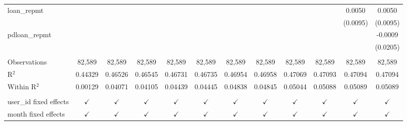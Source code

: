 \begin{table}[htbp]
\begin{tiny}
\begin{tabular}{lccccccccccc}
         loan\_repmt            &                 &                 &                 &                 &                 &                 &                 &                 &                 & 0.0050          & 0.0050\\
                                 &                 &                 &                 &                 &                 &                 &                 &                 &                 & (0.0095)        & (0.0095)\\
         pdloan\_repmt          &                 &                 &                 &                 &                 &                 &                 &                 &                 &                 & -0.0009\\
                                 &                 &                 &                 &                 &                 &                 &                 &                 &                 &                 & (0.0205)\\
                                 &                 &                 &                 &                 &                 &                 &                 &                 &                 &                 &  \\
         Observations            & 82,589          & 82,589          & 82,589          & 82,589          & 82,589          & 82,589          & 82,589          & 82,589          & 82,589          & 82,589          & 82,589\\
         R$^2$                   & 0.44329         & 0.46526         & 0.46545         & 0.46731         & 0.46735         & 0.46954         & 0.46958         & 0.47069         & 0.47093         & 0.47094         & 0.47094\\
         Within R$^2$            & 0.00129         & 0.04071         & 0.04105         & 0.04439         & 0.04445         & 0.04838         & 0.04845         & 0.05044         & 0.05088         & 0.05089         & 0.05089\\
                                 &                 &                 &                 &                 &                 &                 &                 &                 &                 &                 &  \\
         user\_id fixed effects & $\checkmark$   & $\checkmark$   & $\checkmark$   & $\checkmark$   & $\checkmark$   & $\checkmark$   & $\checkmark$   & $\checkmark$   & $\checkmark$   & $\checkmark$   & $\checkmark$\\
         month fixed effects     & $\checkmark$   & $\checkmark$   & $\checkmark$   & $\checkmark$   & $\checkmark$   & $\checkmark$   & $\checkmark$   & $\checkmark$   & $\checkmark$   & $\checkmark$   & $\checkmark$\\
         \bottomrule
      \end{tabular}
   \end{tiny}
\end{table}


